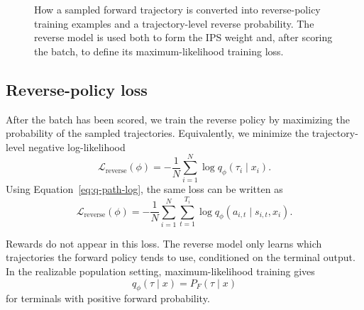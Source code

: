 \documentclass[11pt]{article}
\newcommand{\PF}{P_F}
\newcommand{\qphi}{q_\phi}
\begin{document}
\begin{figure}[p]
{%
}
\caption{
How a sampled forward trajectory is converted into reverse-policy
training examples and a trajectory-level reverse probability.
The reverse model is used both to form the IPS weight and, after
scoring the batch, to define its maximum-likelihood training loss.
}
\label{fig:reverse-training}
\end{figure}

\subsection{Reverse-policy loss}

After the batch has been scored, we train the reverse policy by maximizing the probability of the sampled trajectories. Equivalently, we minimize the trajectory-level negative log-likelihood
\begin{equation}
    \boxed{
    \mathcal{L}_{\mathrm{reverse}}(\phi)
    =
    -\frac{1}{N}
    \sum_{i=1}^{N}
    \log \qphi(\tau_i\mid x_i)
    }.
    \label{eq:reverse-loss-path}
\end{equation}
Using Equation~\eqref{eq:q-path-log}, the same loss can be written as
\begin{equation}
    \boxed{
    \mathcal{L}_{\mathrm{reverse}}(\phi)
    =
    -\frac{1}{N}
    \sum_{i=1}^{N}
    \sum_{t=1}^{T_i}
    \log \qphi(a_{i,t}\mid s_{i,t},x_i)
    }.
    \label{eq:reverse-loss-edge}
\end{equation}

Rewards do not appear in this loss. The reverse model only learns which trajectories the forward policy tends to use, conditioned on the terminal output. In the realizable population setting, maximum-likelihood training gives
\begin{equation}
    \qphi(\tau\mid x)=\PF(\tau\mid x)
\end{equation}
for terminals with positive forward probability.
\end{document}

